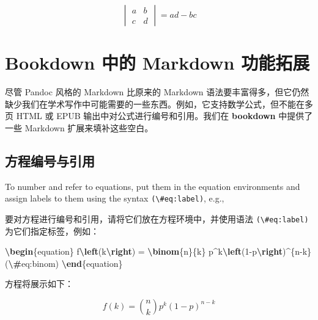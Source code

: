 \documentclass[
  12pt,
]{krantz}
\newenvironment{Shaded}{\begin{snugshade}}{\end{snugshade}}
\newcommand{\ExtensionTok}[1]{#1}
\newcommand{\KeywordTok}[1]{\textcolor[rgb]{0.13,0.29,0.53}{\textbf{#1}}}
\newcommand{\NormalTok}[1]{#1}
\newcommand{\SpecialCharTok}[1]{\textcolor[rgb]{0.81,0.36,0.00}{\textbf{#1}}}
\newcommand{\SpecialStringTok}[1]{\textcolor[rgb]{0.31,0.60,0.02}{#1}}
\theoremstyle{definition}
\theoremstyle{definition}
\theoremstyle{definition}
\theoremstyle{definition}
\theoremstyle{remark}
\begin{document}
\[\begin{vmatrix}a & b\\
c & d
\end{vmatrix}=ad-bc\]

\hypertarget{bookdown-ux4e2dux7684-markdown-ux529fux80fdux62d3ux5c55}{%
\section{Bookdown 中的 Markdown 功能拓展}\label{bookdown-ux4e2dux7684-markdown-ux529fux80fdux62d3ux5c55}}

尽管 Pandoc 风格的 Markdown 比原来的 Markdown 语法要丰富得多，但它仍然缺少我们在学术写作中可能需要的一些东西。例如，它支持数学公式，但不能在多页 HTML 或 EPUB 输出中对公式进行编号和引用。我们在 \textbf{bookdown} 中提供了一些 Markdown 扩展来填补这些空白。

\hypertarget{equations}{%
\subsection{方程编号与引用}\label{equations}}

To number and refer to equations, put them in the equation environments and assign labels to them using the syntax \texttt{(\textbackslash{}\#eq:label)}, e.g.,

要对方程进行编号和引用，请将它们放在方程环境中，并使用语法 \texttt{(\textbackslash{}\#eq:label)} 为它们指定标签，例如：

\begin{Shaded}
\begin{Highlighting}[]
\KeywordTok{\textbackslash{}begin}\NormalTok{\{}\ExtensionTok{equation}\NormalTok{\}}\SpecialStringTok{ }
\SpecialStringTok{  f}\SpecialCharTok{\textbackslash{}left}\SpecialStringTok{(k}\SpecialCharTok{\textbackslash{}right}\SpecialStringTok{) = }\SpecialCharTok{\textbackslash{}binom}\SpecialStringTok{\{n\}\{k\} p\^{}k}\SpecialCharTok{\textbackslash{}left}\SpecialStringTok{(1{-}p}\SpecialCharTok{\textbackslash{}right}\SpecialStringTok{)\^{}\{n{-}k\}}
\SpecialStringTok{  (}\SpecialCharTok{\textbackslash{}\#}\SpecialStringTok{eq:binom)}
\KeywordTok{\textbackslash{}end}\NormalTok{\{}\ExtensionTok{equation}\NormalTok{\} }
\end{Highlighting}
\end{Shaded}

方程将展示如下：

\begin{equation}
f\left(k\right)=\binom{n}{k}p^k\left(1-p\right)^{n-k} \label{eq:binom}
\end{equation}
\end{document}

